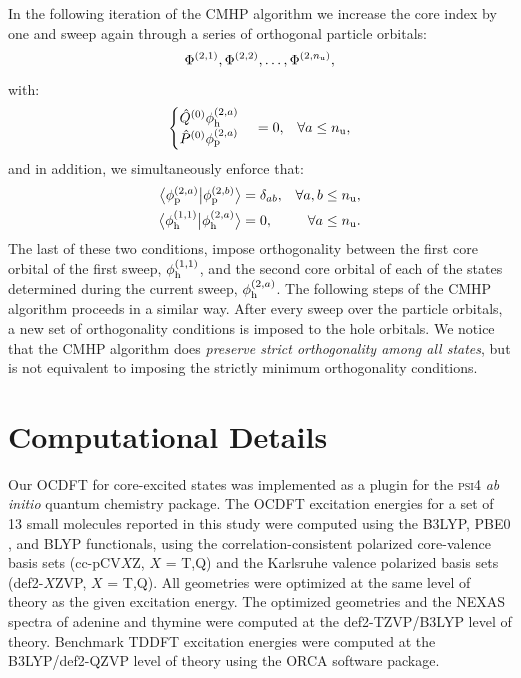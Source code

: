 \documentclass[12pt]{article}
\newcommand{\braket}[3][0]
{\ifthenelse{\equal{#1}{0}}{\left\langle #2 \middle| #3 \right\rangle}
{\ifthenelse{\equal{#1}{1}}{\big\langle #2 \big| #3 \big\rangle}
{\ifthenelse{\equal{#1}{2}}{\Big\langle #2 \Big| #3 \Big\rangle}
{\ifthenelse{\equal{#1}{3}}{\bigg\langle #2 \bigg| #3 \bigg\rangle}
{\ifthenelse{\equal{#1}{4}}{\Bigg\langle #2 \Bigg| #3 \Bigg\rangle}
{Error}}}}}
}
\begin{document}
In the following iteration of the CMHP algorithm we increase the core index by one and sweep again through a series of orthogonal particle orbitals:
\begin{equation}
\Phi^{(2,1)}, \Phi^{(2,2)}, \ldots, \Phi^{(2,n_{\rm u})},
\end{equation}
with:
\begin{align}
\begin{cases}
\hat{Q}^{(0)}\phi_{\rm h}^{(2,a)}\\
\hat{P}^{(0)}\phi_{\rm p}^{(2,a)}
\end{cases} &= 0,&\forall a \leq n_{\rm u},
\end{align}
and in addition, we simultaneously enforce that:
\begin{align}
\braket[1]{\phi^{(2,a)}_{\rm p}}{\phi^{(2,b)}_{\rm p}} &= \delta_{ab},&\forall a,b \leq n_{\rm u},\\
\braket[1]{\phi^{(1,1)}_{\rm h}}{\phi^{(2,a)}_{\rm h}} &=0,&\forall a \leq n_{\rm u}.
\end{align}
The last of these two conditions, impose orthogonality between the first core orbital of the first sweep, $\phi^{(1,1)}_{\rm h}$, and the second core orbital of each of the states determined during the current sweep, $\phi^{(2,a)}_{\rm h}$.
The following steps of the CMHP algorithm proceeds in a similar way.  After every sweep over the particle orbitals, a new set of orthogonality conditions is imposed to the hole orbitals.
We notice that the CMHP algorithm does \textit{preserve strict orthogonality among all states}, but is not equivalent to imposing the strictly minimum orthogonality conditions.


\section{Computational Details}
Our OCDFT for core-excited states was implemented as a plugin for the \textsc{psi4} \textit{ab initio} quantum chemistry package.\cite{turney_psi4:_2012}
The OCDFT excitation energies for a set of 13 small molecules reported in this study were computed using the B3LYP, \cite{becke_new_1993,lee_development_1988,vosko_accurate_1980,stephens_ab_1994} PBE0 \cite{adamo_toward_1999}, and BLYP\cite{stephens_ab_1994,miehlich_results_1989} functionals, using the correlation-consistent polarized core-valence basis sets (cc-pCV$X$Z, $X$ = T,Q)\cite{woon_gaussian_1995-1}
and the Karlsruhe valence polarized basis sets (def2-$X$ZVP, $X$ = T,Q).\cite{weigend_balanced_2005,weigend_accurate_2006} All geometries were optimized at the same level of theory as the given excitation energy.
The optimized geometries and the NEXAS spectra of adenine and thymine were computed at the def2-TZVP/B3LYP level of theory. 
Benchmark TDDFT excitation energies were computed at the B3LYP/def2-QZVP level of theory using the ORCA software package.\cite{neese_orca_2012}
\end{document}
